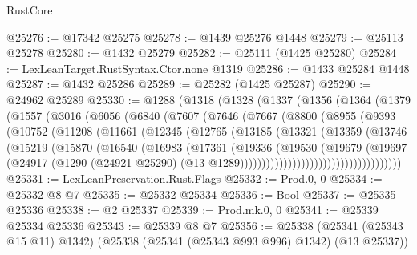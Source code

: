 \begin{lexlean}{RustCore}
\begin{coremodule}
@25276 := @17342 @25275
@25278 := @1439 @25276 @1448
@25279 := @25113 @25278
@25280 := @1432 @25279
@25282 := @25111 (@1425 @25280)
@25284 := LexLeanTarget.RustSyntax.Ctor.none @1319
@25286 := @1433 @25284 @1448
@25287 := @1432 @25286
@25289 := @25282 (@1425 @25287)
@25290 := @24962 @25289
@25330 := @1288
    (@1318
      (@1328
        (@1337
          (@1356
            (@1364
              (@1379
                (@1557
                  (@3016
                    (@6056
                      (@6840
                        (@7607
                          (@7646
                            (@7667
                              (@8800
                                (@8955
                                  (@9393
                                    (@10752
                                      (@11208
                                        (@11661
                                          (@12345
                                            (@12765
                                              (@13185
                                                (@13321
                                                  (@13359
                                                    (@13746
                                                      (@15219
                                                        (@15870
                                                          (@16540
                                                            (@16983
                                                              (@17361
                                                                (@19336
                                                                  (@19530
                                                                    (@19679
                                                                      (@19697
                                                                        (@24917
                                                                          (@1290
                                                                            (@24921 @25290)
                                                                            (@13
                                                                              @1289)))))))))))))))))))))))))))))))))))))
@25331 := LexLeanPreservation.Rust.Flags
@25332 := Prod.{0, 0}
@25334 := @25332 @8 @7
@25335 := @25332 @25334
@25336 := Bool
@25337 := @25335 @25336
@25338 := @2 @25337
@25339 := Prod.mk.{0, 0}
@25341 := @25339 @25334 @25336
@25343 := @25339 @8 @7
@25356 := @25338
    (@25341 (@25343 @15 @11) @1342)
    (@25338 (@25341 (@25343 @993 @996) @1342) (@13 @25337))

\end{coremodule}
\end{lexlean}
